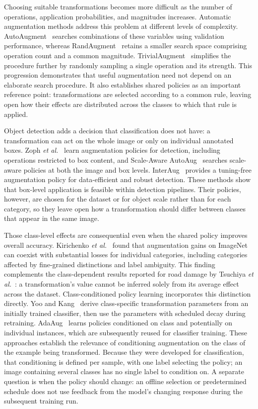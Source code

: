 \documentclass[conference]{IEEEtran}
\begin{document}
Choosing suitable transformations becomes more difficult as the number of operations, application probabilities, and magnitudes increases. Automatic augmentation methods address this problem at different levels of complexity. AutoAugment~\cite{cubuk2019auto} searches combinations of these variables using validation performance, whereas RandAugment~\cite{cubuk2020rand} retains a smaller search space comprising operation count and a common magnitude. TrivialAugment~\cite{muller2021trivial} simplifies the procedure further by randomly sampling a single operation and its strength. This progression demonstrates that useful augmentation need not depend on an elaborate search procedure. It also establishes shared policies as an important reference point: transformations are selected according to a common rule, leaving open how their effects are distributed across the classes to which that rule is applied.

Object detection adds a decision that classification does not have: a transformation can act on the whole image or only on individual annotated boxes. Zoph \emph{et al.}~\cite{zoph2020det} learn augmentation policies for detection, including operations restricted to box content, and Scale-Aware AutoAug~\cite{chen2021scale} searches scale-aware policies at both the image and box levels. InterAug~\cite{thopalli2023interaug} provides a tuning-free augmentation policy for data-efficient and robust detection. These methods show that box-level application is feasible within detection pipelines. Their policies, however, are chosen for the dataset or for object scale rather than for each category, so they leave open how a transformation should differ between classes that appear in the same image.

Those class-level effects are consequential even when the shared policy improves overall accuracy. Kirichenko \emph{et al.}~\cite{kirichenko2023} found that augmentation gains on ImageNet can coexist with substantial losses for individual categories, including categories affected by fine-grained distinctions and label ambiguity. This finding complements the class-dependent results reported for road damage by Tsuchiya \emph{et al.}~\cite{tsuchiya2019}: a transformation's value cannot be inferred solely from its average effect across the dataset. Class-conditioned policy learning incorporates this distinction directly. Yoo and Kang~\cite{yoo2023} derive class-specific transformation parameters from an initially trained classifier, then use the parameters with scheduled decay during retraining. AdaAug~\cite{cheung2022adaaug} learns policies conditioned on class and potentially on individual instances, which are subsequently reused for classifier training. These approaches establish the relevance of conditioning augmentation on the class of the example being transformed. Because they were developed for classification, that conditioning is defined per sample, with one label selecting the policy; an image containing several classes has no single label to condition on. A separate question is when the policy should change: an offline selection or predetermined schedule does not use feedback from the model's changing response during the subsequent training run.
\end{document}
